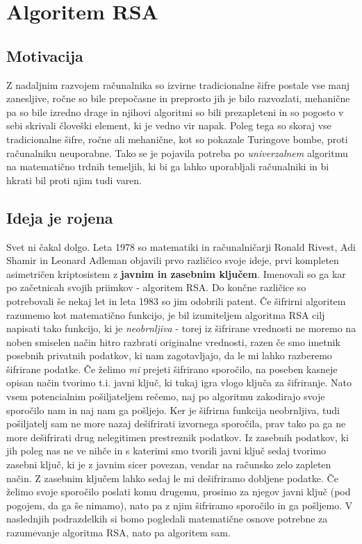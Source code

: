 \documentclass[a4paper, 12pt]{article} %
\begin{document}
\newpage
\section{Algoritem RSA}

\subsection{Motivacija}

Z nadaljnim razvojem računalnika so izvirne tradicionalne šifre postale vse manj zanesljive, ročne so bile prepočasne in preprosto jih je bilo razvozlati, mehanične pa so bile izredno drage in njihovi algoritmi so bili prezapleteni in so pogosto v sebi skrivali človeški element, ki je vedno vir napak. Poleg tega so skoraj vse tradicionalne šifre, ročne ali mehanične, kot so pokazale Turingove bombe, proti računalniku neuporabne. Tako se je pojavila potreba po \emph{univerzalnem} algoritmu na matematično trdnih temeljih, ki bi ga lahko uporabljali računalniki in bi hkrati bil proti njim tudi varen.

\subsection{Ideja je rojena}

Svet ni čakal dolgo. Leta 1978 so matematiki in računalničarji Ronald Rivest, Adi Shamir in Leonard Adleman objavili prvo različico svoje ideje, prvi kompleten asimetričen kriptosistem z \textbf{javnim in zasebnim ključem}. Imenovali so ga kar po začetnicah svojih priimkov - algoritem RSA. Do končne različice so potrebovali še nekaj let in leta 1983 so jim odobrili patent.
\newline
\newline
Če šifrirni algoritem razumemo kot matematično funkcijo, je bil izumiteljem algoritma RSA cilj napisati tako funkcijo, ki je \emph{neobrnljiva} - torej iz šifrirane vrednosti ne moremo na noben smiselen način hitro razbrati originalne vrednosti, razen če smo imetnik posebnih privatnih podatkov, ki nam zagotavljajo, da le mi lahko razberemo šifrirane podatke. Če želimo \emph{mi} prejeti šifrirano sporočilo, na poseben kasneje opisan način tvorimo t.i. javni ključ, ki tukaj igra vlogo ključa za šifriranje. Nato vsem potencialnim pošiljateljem rečemo, naj po algoritmu zakodirajo svoje sporočilo nam in naj nam ga pošljejo. Ker je šifrirna funkcija neobrnljiva, tudi pošiljatelj sam ne more nazaj dešifrirati izvornega sporočila, prav tako pa ga ne more dešifrirati drug nelegitimen prestreznik podatkov. Iz zasebnih podatkov, ki jih poleg nas ne ve nihče in s katerimi smo tvorili javni ključ sedaj tvorimo zasebni ključ, ki je z javnim sicer povezan, vendar na računsko zelo zapleten način. Z zasebnim ključem lahko sedaj le mi dešifriramo dobljene podatke. Če želimo svoje sporočilo poslati komu drugemu, prosimo za njegov javni ključ (pod pogojem, da ga še nimamo), nato pa z njim šifriramo sporočilo in ga pošljemo.
\newline
\newline
V naslednjih podrazdelkih si bomo pogledali matematične osnove potrebne za razumevanje algoritma RSA, nato pa algoritem sam.
\end{document}
